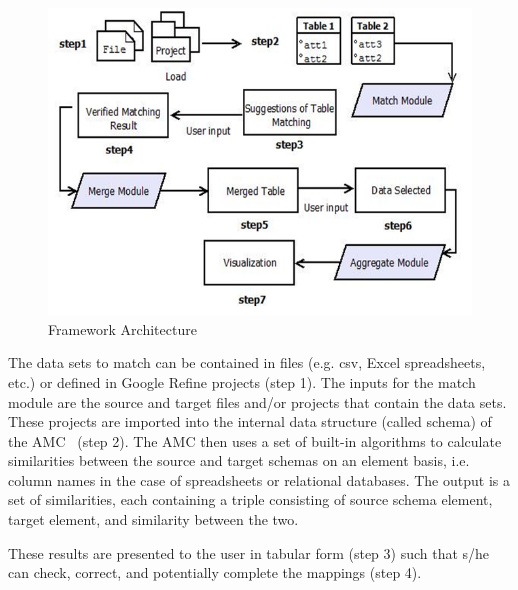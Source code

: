 \documentclass{sig-alternate}
\begin{document}
\begin{figure}[ht!]
  \centering
    \includegraphics[scale=0.4]{architecture-2.png}
  \caption{Framework Architecture}
  \label{fig:2}
\end{figure}

The data sets to match can be contained in files (e.g. csv, Excel spreadsheets, etc.) or defined in Google Refine projects (step 1). The inputs for the match module are the source and target files and/or projects that contain the data sets. These projects are imported into the internal data structure (called schema) of the AMC~\cite{5767940} (step 2). The AMC then uses a set of built-in algorithms to calculate similarities between the source and target schemas on an element basis, i.e. column names in the case of spreadsheets or relational databases. The output is a set of similarities, each containing a triple consisting of source schema element, target element, and similarity between the two.

These results are presented to the user in tabular form (step 3) such that s/he can check, correct, and potentially complete the mappings (step 4).
\end{document}
